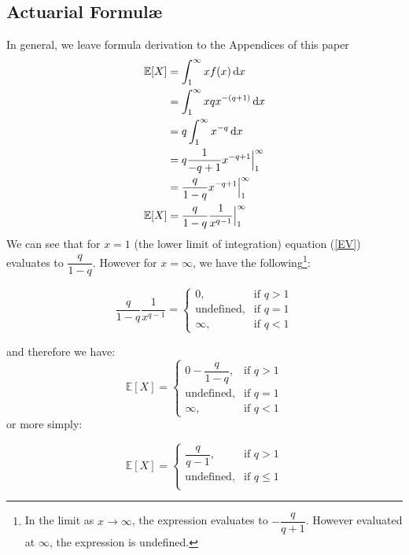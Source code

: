 \documentclass[]{article} %
\begin{document}
\subsection{Actuarial Formul\ae}
In general, we leave formula derivation to the Appendices of this paper
\begin{align}
	\mathbb{E}[X] & = \int_{1}^{\infty}x f(x) \operatorname{d \!} x \nonumber\\
		& = \int_{1}^{\infty}xqx^{-(q+1)} \operatorname{d \!} x\nonumber\\
		& = q \int_{1}^{\infty}x^{-q} \operatorname{d \!} x\nonumber\\
		& = q \frac{1}{-q+1} x^{-q+1} \Big|_{1}^{\infty}\nonumber\\
		& = \frac{q}{1-q} x^{-q+1} \Big|_{1}^{\infty}\nonumber\\
	\mathbb{E}[X] 	& = \frac{q}{1-q} \dfrac{1}{x^{q-1}} \Big|_{1}^{\infty}\label{EV}
\end{align}
We can see that for $x = 1$ (the lower limit of integration) equation (\ref{EV}) evaluates to $\dfrac{q}{1-q}$. However for $x = \infty$, we have the following\footnote{In the limit as $x\to\infty$, the expression evaluates to  $-\dfrac{q}{q+1}$. However evaluated at $\infty$, the expression is undefined.}:

\[
    \frac{q}{1-q} \dfrac{1}{x^{q-1}} = 
\begin{cases}
    0,& \text{if } q > 1\\
    \text{undefined},& \text{if } q = 1\\         
    \infty, & \text{if }q < 1
\end{cases}
\]

and therefore we have: 
\[
    \mathbb{E}[X]  = 
\begin{cases}
    0 - \dfrac{q}{1-q},& \text{if } q > 1\\
    \text{undefined},& \text{if } q = 1\\         
    \infty, & \text{if }q < 1
\end{cases}
\]
or more simply:

\begin{equation}
\mathbb{E}[X]  = 
\begin{cases}
\dfrac{q}{q-1},& \text{if } q > 1\\
\text{undefined},& \text{if } q \leq 1\\         
\end{cases}
\end{equation}

\end{document}
